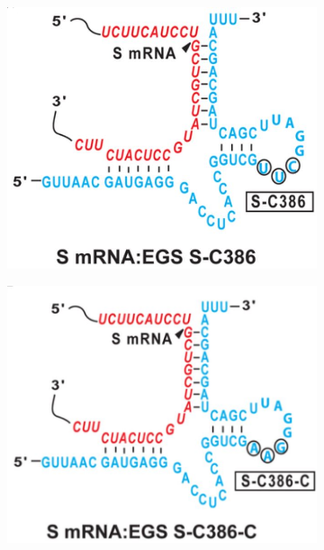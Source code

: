 \documentclass[twoside,a4paper]{report}
\begin{document}
\begin{figure}[h!tb]
	 	\begin{subfigure}{.25\textwidth}
	 		\centering
	 		\includegraphics[width=.9\linewidth]{SC386}
	 		\label{fig:SC386}
	 	\end{subfigure}
	 	\begin{subfigure}{.25\textwidth}
	 		\centering
	 		\includegraphics[width=.9\linewidth]{sc386c}
	 	

\end{subfigure}
\end{figure}
\end{document}
